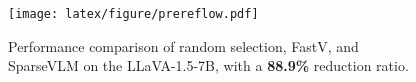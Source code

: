 \begin{figure}[t]
    \centering
    \texttt{[image: latex/figure/prereflow.pdf]}
    \caption{Performance comparison of random selection, FastV, and SparseVLM on the LLaVA-1.5-7B, with a \textbf{88.9\%} reduction ratio.}
    \label{fig:random_vs_others}
\end{figure}
